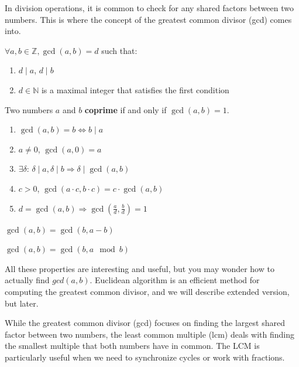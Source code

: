 \documentclass[../lecture-notes.tex]{subfiles}
\begin{document}
\vspace{10pt}

In division operations, it is common to check for any shared factors between two numbers. This is where the concept of the greatest common divisor (gcd) comes into.

\begin{definition}
    $\forall a, b \in \mathbb{Z}, \gcd(a, b) = d$ such that:
    \begin{enumerate}
        \item $d \mid a$, $d \mid b$
        \item $d  \in \mathbb{N}$ is a maximal integer that satisfies the first condition
    \end{enumerate}
\end{definition}

\begin{definition}
    Two numbers $a$ and $b$ \textbf{coprime} if and only if $\gcd(a, b) = 1$.
\end{definition}

\begin{lemma} 
    \hfil
    \begin{enumerate}
        \item $\gcd(a, b) = b \iff b \mid a$
        \item $a \neq 0$, $\gcd(a, 0) = a$
        \item $\exists \delta$: $\delta \mid a, \delta \mid b \Rightarrow \delta \mid \gcd(a, b)$
        \item $c > 0$, $\gcd(a \cdot c, b \cdot c) = c \cdot \gcd(a, b)$
        \item $d = \gcd(a, b) \Rightarrow \gcd(\frac{a}{d}, \frac{b}{d}) = 1$
    \end{enumerate}
\end{lemma}

\begin{lemma}
    $\gcd(a, b) = \gcd(b, a - b)$
\end{lemma}

\begin{corollary}
    $\gcd(a, b) = \gcd(b, a \mod b)$
\end{corollary}

All these properties are interesting and useful, but you may wonder how to actually find $gcd(a, b)$. Euclidean algorithm is an efficient method for computing the greatest common divisor, and we will describe extended version, but later.

While the greatest common divisor (gcd) focuses on finding the largest shared factor between two numbers, the least common multiple (lcm) deals with finding the smallest multiple that both numbers have in common. The LCM is particularly useful when we need to synchronize cycles or work with fractions.
\end{document}
